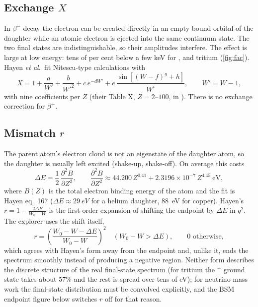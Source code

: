\subsection{Exchange $X$}
In $\beta^-$ decay the electron can be created directly in an empty bound orbital of the daughter while an atomic electron is ejected into the same continuum state. The two final states are indistinguishable, so their amplitudes interfere. The effect is large at low energy: tens of per cent below a few keV for ,  and tritium (\cref{fig:fac}). Hayen \emph{et al.}\ fit Nitescu-type calculations with
\begin{equation}
X = 1 + \frac{a}{W'} + \frac{b}{W'^2} + c\,e^{-dW'} + e\,\frac{\sin\left[(W - f)^g + h\right]}{W^i}, \qquad W' = W - 1,
\end{equation}
with nine coefficients per $Z$ (their Table X, $Z = 2$--$100$, in ). There is no exchange correction for $\beta^+$.

\subsection{Mismatch $r$}
The parent atom's electron cloud is not an eigenstate of the daughter atom, so the daughter is usually left excited (shake-up, shake-off). On average this costs
\begin{equation}
\Delta E = \frac12\,\frac{\partial^2 B}{\partial Z^2}, \qquad \frac{\partial^2 B}{\partial Z^2} \approx 44.200\,Z^{0.41} + 2.3196\times10^{-7}\,Z^{4.45}\ \text{eV},
\end{equation}
where $B(Z)$ is the total electron binding energy of the atom and the fit is Hayen eq.\ 167 ($\Delta E \approx \SI{29}{eV}$ for a helium daughter, \SI{88}{eV} for copper). Hayen's $r = 1 - \frac{2\Delta E}{W_0 - W}$ is the first-order expansion of shifting the endpoint by $\Delta E$ in $q^2$. The explorer uses the shift itself,
\begin{equation}
r = \left(\frac{W_0 - W - \Delta E}{W_0 - W}\right)^2 \quad (W_0 - W > \Delta E), \qquad 0 \text{ otherwise},
\end{equation}
which agrees with Hayen's form away from the endpoint and, unlike it, ends the spectrum smoothly instead of producing a negative region. Neither form describes the discrete structure of the real final-state spectrum (for tritium the $^+$ ground state takes about 57\% and the rest is spread over tens of eV); for neutrino-mass work the final-state distribution must be convolved explicitly, and the BSM endpoint figure below switches $r$ off for that reason.


